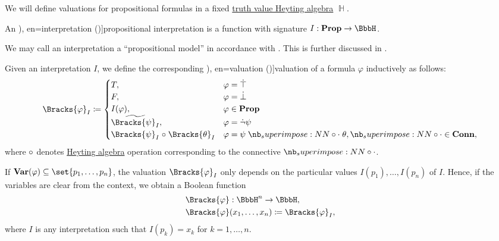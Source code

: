 \begin{definition}\label{def:propositional_valuation}\mimprovised
  We will define valuations for propositional formulas in a fixed \hyperref[def:truth_value_algebra]{truth value Heyting algebra} \( \BbbH \).

  \begin{thmenum}
     An \term[ru=интерпретация (\cite[17]{Герасимов2011}), en=interpretation (\cite[10]{Smullyan1995})]{propositional interpretation} is a function with signature \( I: \op*{Prop} \to \BbbH \).

    We may call an interpretation a \enquote{propositional model} in accordance with . This is further discussed in .

     Given an interpretation \( I \), we define the corresponding \term[ru=значение истинности (формулы) (\cite[8]{Эдельман1975}), en=valuation (\cite[10]{Smullyan1995})]{valuation} of a formula \( \varphi \) inductively as follows:
    \begin{equation}\label{eq:def:propositional_valuation/formula_valuation}
      \Bracks{\varphi}_I \coloneqq \begin{cases}
        T,                                         &\varphi = \syntop \\
        F,                                         &\varphi = \synbot \\
        I(\varphi),                                &\varphi \in \op*{Prop} \\
        \widetilde{\Bracks{\psi}_I},               &\varphi = \synneg \psi \\
        \Bracks{\psi}_I \relcirc \Bracks{\theta}_I &\varphi = \psi \syncirc \theta, {\syncirc} \in \op*{Conn},
      \end{cases}
    \end{equation}
    where \( \relcirc \) denotes \hyperref[def:heyting_algebra]{Heyting algebra} operation corresponding to the connective \( \syncirc \).

     If \( \op*{Var}(\varphi) \subseteq \set{ p_1, \ldots, p_n } \), the valuation \( \Bracks{\varphi}_I \) only depends on the particular values \( I(p_1), \ldots, I(p_n) \) of \( I \). Hence, if the variables are clear from the context, we obtain a Boolean function
    \begin{equation*}
      \begin{aligned}
        &\Bracks{\varphi}: \BbbH^n \to \BbbH, \\
        &\Bracks{\varphi}(x_1, \ldots, x_n) \coloneqq \Bracks{\varphi}_I,
      \end{aligned}
    \end{equation*}
    where \( I \) is any interpretation such that \( I(p_k) = x_k \) for \( k = 1, \ldots, n \).


\end{thmenum}
\end{definition}
